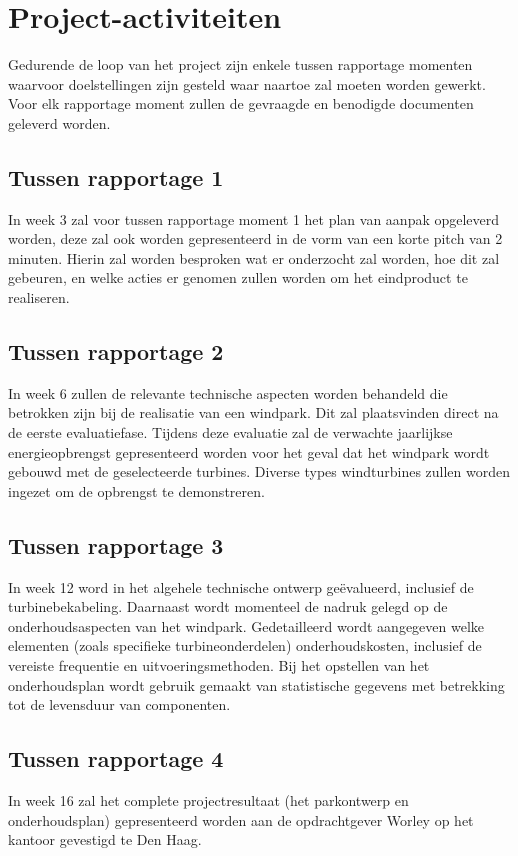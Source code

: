 \section{Project-activiteiten}
Gedurende de loop van het project zijn enkele tussen rapportage momenten waarvoor doelstellingen zijn gesteld waar naartoe zal moeten worden gewerkt. Voor elk rapportage moment zullen de gevraagde en benodigde documenten geleverd worden.

\subsection{Tussen rapportage 1}
In week 3 zal voor tussen rapportage moment 1 het plan van aanpak opgeleverd worden, deze zal ook worden gepresenteerd in de vorm van een korte pitch van 2 minuten. Hierin zal worden besproken wat er onderzocht zal worden, hoe dit zal gebeuren, en welke acties er genomen zullen worden om het eindproduct te realiseren.

\subsection{Tussen rapportage 2}
In week 6 zullen de relevante technische aspecten worden behandeld die betrokken zijn bij de realisatie van een windpark. Dit zal plaatsvinden direct na de eerste evaluatiefase. Tijdens deze evaluatie zal de verwachte jaarlijkse energieopbrengst gepresenteerd worden voor het geval dat het windpark wordt gebouwd met de geselecteerde turbines. Diverse types windturbines zullen worden ingezet om de opbrengst te demonstreren.

\subsection{Tussen rapportage 3}
In week 12 word in het algehele technische ontwerp geëvalueerd, inclusief de turbinebekabeling. Daarnaast wordt momenteel de nadruk gelegd op de onderhoudsaspecten van het windpark. Gedetailleerd wordt aangegeven welke elementen (zoals specifieke turbineonderdelen) onderhoudskosten, inclusief de vereiste frequentie en uitvoeringsmethoden. Bij het opstellen van het onderhoudsplan wordt gebruik gemaakt van statistische gegevens met betrekking tot de levensduur van componenten.

\subsection{Tussen rapportage 4}
In week 16 zal het complete projectresultaat (het parkontwerp en onderhoudsplan) gepresenteerd worden aan de opdrachtgever Worley op het kantoor gevestigd te Den Haag.